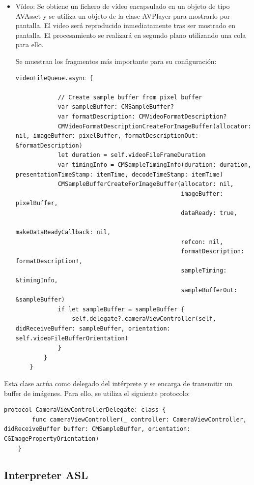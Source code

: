 \documentclass[../main.tex]{subfiles}
\begin{document}
\begin{itemize}
    \item Vídeo: Se obtiene un fichero de vídeo encapsulado en un objeto de tipo AVAsset y se utiliza un objeto de la clase AVPlayer para mostrarlo por pantalla. El video será reproducido inmediatamente tras ser mostrado en pantalla. El procesamiento se realizará en segundo plano utilizando una cola para ello.
    
    Se muestran los fragmentos más importante para su configuración:
    \begin{lstlisting}[style=swift]
    videoFileQueue.async {
            
            // Create sample buffer from pixel buffer
            var sampleBuffer: CMSampleBuffer?
            var formatDescription: CMVideoFormatDescription?
            CMVideoFormatDescriptionCreateForImageBuffer(allocator: nil, imageBuffer: pixelBuffer, formatDescriptionOut: &formatDescription)
            let duration = self.videoFileFrameDuration
            var timingInfo = CMSampleTimingInfo(duration: duration, presentationTimeStamp: itemTime, decodeTimeStamp: itemTime)
            CMSampleBufferCreateForImageBuffer(allocator: nil,
                                               imageBuffer: pixelBuffer,
                                               dataReady: true,
                                               makeDataReadyCallback: nil,
                                               refcon: nil,
                                               formatDescription: formatDescription!,
                                               sampleTiming: &timingInfo,
                                               sampleBufferOut: &sampleBuffer)
            if let sampleBuffer = sampleBuffer {
                self.delegate?.cameraViewController(self, didReceiveBuffer: sampleBuffer, orientation: self.videoFileBufferOrientation)
            }
        }
    }
    \end{lstlisting}
\end{itemize}
    Esta clase actúa como delegado del intérprete y se encarga de transmitir un buffer de imágenes. Para ello, se utiliza el siguiente protocolo:
    
    \begin{lstlisting}[style=swift]
    protocol CameraViewControllerDelegate: class {
        func cameraViewController(_ controller: CameraViewController, didReceiveBuffer buffer: CMSampleBuffer, orientation: CGImagePropertyOrientation)
    }
    \end{lstlisting}

\subsection{Interpreter ASL}
\end{document}
